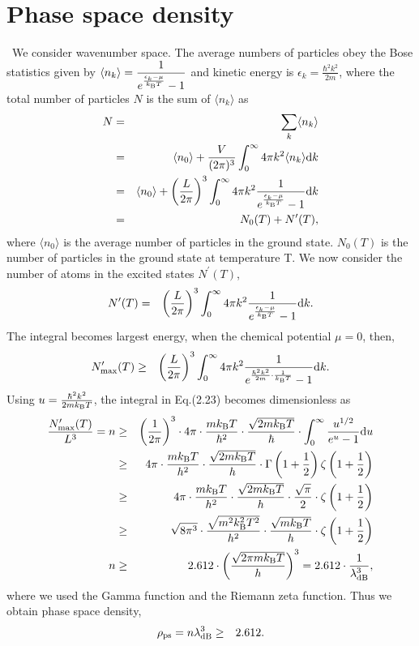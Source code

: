 \documentclass[12pt,a4paper]{report} %
\newcommand{\diff}{\mathrm{d}}				%
\newcommand{\kb} {k_{\rm B}}				%
\begin{document}
\section{Phase space density}
\ We consider wavenumber space.
The average numbers of particles obey the Bose statistics given by
$\displaystyle \langle n_k \rangle = \frac{1}{e^{\frac{\epsilon_k - \mu}{\kb T}} - 1}$
and kinetic energy is $\displaystyle \epsilon_k = \frac{\hbar^2 k^2}{2 m}$,
 where the total number of particles $N$ is the sum of $\langle n_k \rangle$ as
\begin{eqnarray}
N & = & \sum_k \langle n_k \rangle
\\
& = & \langle n_0 \rangle  + \frac{V}{(2\pi)^3} \int_0^\infty 4 \pi k^2 \langle n_k \rangle \diff k  \nonumber
\\
& = & \langle n_0 \rangle + \left( \frac{L}{2\pi} \right)^3 \int_0^\infty 4 \pi k^2 \nonumber
\frac{1}{e^{\frac{\epsilon_k - \mu}{\kb T}} - 1} \diff k
\\
& = & N_0(T) + N^\prime(T),
\end{eqnarray}
where $\langle n_0 \rangle$ is the average number of particles in the ground state.
$N_0(T)$ is the number of particles in the ground state at temperature T.
We now consider the number of atoms in the excited states $N^\prime(T)$,
\begin{eqnarray}
N^\prime(T) & = & \left(\frac{L}{2 \pi}\right)^3 \int_0^\infty 4 \pi k^2 
 \frac{1}{e^{\frac{\epsilon_k - \mu}{\kb T}} - 1}  \diff k.
\end{eqnarray}
The integral becomes largest energy, when the chemical potential $\mu=0$, then,
\begin{eqnarray}
N^\prime_{{\rm max}}(T) & \ge & \left(\frac{L}{2 \pi}\right)^3 \int_0^\infty 4 \pi k^2 
 \frac{1}{e^{\frac{\hbar^2 k^2}{2 m} \cdot \frac{1}{\kb T}} - 1}  \diff k.
\end{eqnarray}
Using $u = \frac{\hbar^2 k^2}{2 m \kb T}$, the integral in Eq.(2.23) becomes dimensionless as
\begin{eqnarray}
\frac{N^\prime_{{\rm max}}(T)}{L^3} = n  & \ge & \left(\frac{1}{2 \pi} \right)^3 \cdot 
4 \pi \cdot \frac{m \kb T}{\hbar^2} \cdot \frac{\sqrt{2 m \kb T}}{\hbar} \cdot
\int_0^\infty \frac{u^{1/2}}{e^u - 1} \diff u
\\
& \ge & 4 \pi \cdot \frac{m \kb T}{h^2} \cdot \frac{\sqrt{2 m \kb T}}{h} \cdot \Gamma \left( 1+\frac{1}{2}\right) \zeta \left( 1+\frac{1}{2}\right)  \nonumber
\\
& \ge & 4 \pi \cdot \frac{m \kb T}{h^2} \cdot \frac{\sqrt{2 m \kb T}}{h} \cdot \frac{\sqrt{\pi}}{2}\cdot \zeta \left( 1+\frac{1}{2}\right) \nonumber
\\
& \ge & \sqrt{8 \pi^3} \cdot \frac{\sqrt{m^2 \kb^2 T^2}}{h^2} \cdot \frac{\sqrt{m \kb T}}{h} \cdot \zeta \left( 1+\frac{1}{2}\right) \nonumber
\\
n & \ge & 2.612 \cdot \left( \frac{\sqrt{2 \pi m \kb T}}{h} \right)^{3}
= 2.612 \cdot \frac{1}{\lambda_{{\rm dB}}^3},
\end{eqnarray}
where we used the Gamma function and the Riemann zeta function.
Thus we obtain phase space density,
\begin{eqnarray}
\rho_{{\rm ps}} = n \lambda_{{\rm dB}}^3 & \ge & 2.612.
\end{eqnarray}
\end{document}
